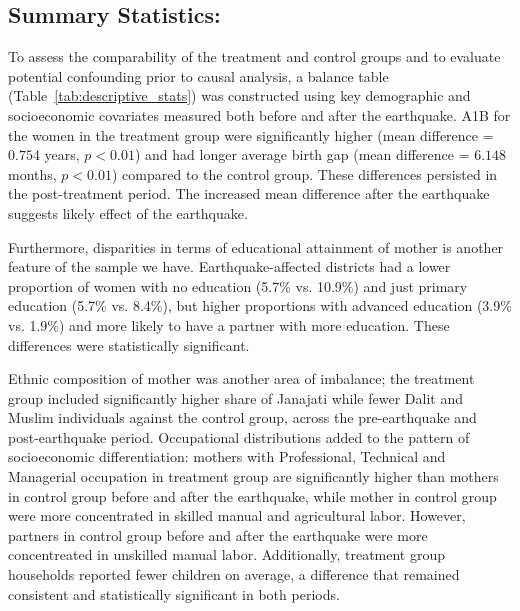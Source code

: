 \documentclass[11pt,a4paper]{article}
\begin{document}
\subsection{Summary Statistics:}

To assess the comparability of the treatment and control groups and to evaluate potential confounding prior to causal analysis, a balance table (Table~\ref{tab:descriptive_stats}) was constructed using key demographic and socioeconomic covariates measured both before and after the earthquake. A1B for the women in the treatment group were significantly higher (mean difference = $0.754$ years, $p < 0.01$) and had longer average birth gap (mean difference = $6.148$ months, $p < 0.01$) compared to the control group. These differences persisted in the post-treatment period. The increased mean difference after the earthquake suggests likely effect of the earthquake. 

\vspace{0.25cm}

Furthermore, disparities in terms of educational attainment of mother is another feature of the sample we have. Earthquake-affected districts had a lower proportion of women with no education (5.7\% vs. 10.9\%) and just primary education (5.7\% vs. 8.4\%), but higher proportions with advanced education (3.9\% vs. 1.9\%) and more likely to have a partner with more education. These differences were statistically significant.

\vspace{0.25 cm}

Ethnic composition of mother was another area of imbalance; the treatment group included significantly higher share of Janajati while fewer Dalit and Muslim individuals against the control group, across the pre-earthquake and post-earthquake period. Occupational distributions added to the pattern of socioeconomic differentiation: mothers with Professional, Technical and Managerial occupation  in treatment group are significantly higher than mothers in control group before and after the earthquake, while mother in control group were more concentrated in skilled manual and agricultural labor. However, partners in control group before and after the earthquake were more concentreated in unskilled manual labor. Additionally, treatment group households reported fewer children on average, a difference that remained consistent and statistically significant in both periods.

\vspace{0.25 cm}
\end{document}
